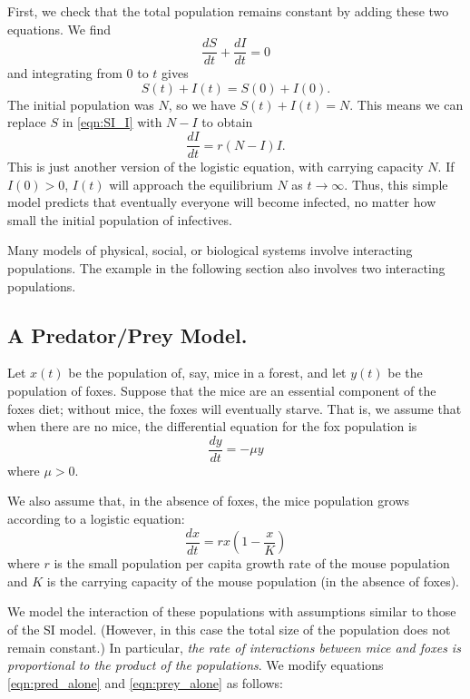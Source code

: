 First, we check that the total population remains constant by adding these
two equations.  We find
\begin{equation}
  \frac{dS}{dt} + \frac{dI}{dt} = 0
\end{equation}
and integrating from $0$ to $t$ gives
\begin{equation}
  S(t) + I(t) = S(0)+I(0).
\end{equation}
The initial population was $N$, so we have
$S(t)+I(t)=N$.
This means we can replace $S$ in \eqref{eqn:SI_I} with
$N-I$ to obtain
\begin{equation}
  \frac{dI}{dt} = r(N-I)I.
\label{eqn:SI_Ionly}
\end{equation}
This is just another version of the logistic equation,
with carrying capacity $N$.
If $I(0)>0$,  $I(t)$ will approach the
equilibrium $N$ as $t\rightarrow\infty$.
Thus, this simple model predicts that
eventually everyone will become infected, no matter how small
the initial population of infectives.


\medskip
Many models of physical, social, or biological systems
involve interacting populations.
The example in the following section also involves
two interacting populations.

\subsection{A Predator/Prey Model.}
Let $x(t)$ be the population of, say, mice in a forest,
and let $y(t)$ be the population of foxes.
Suppose that the mice
are an essential component of the foxes diet; without
mice, the foxes will eventually starve.
That is, we assume that when there are no mice, the
differential equation for the fox population is
\begin{equation}
   \frac{dy}{dt} = -\mu y
\label{eqn:pred_alone}
\end{equation}
where $\mu > 0$.

We also assume that, in the absence of foxes,
the mice population grows
according to a logistic equation:
\begin{equation}
   \frac{dx}{dt} = rx\left(1-\frac{x}{K}\right)
\label{eqn:prey_alone}
\end{equation}
where $r$ is the small population per capita growth rate
of the mouse population and $K$ is the carrying capacity
of the mouse population (in the absence of foxes).

We model the interaction of these populations
with assumptions similar to those of the SI model.
(However, in this case the total size of the population
does not remain constant.)
In particular,
\emph{the rate of interactions between
mice and foxes is proportional to the product
of the populations}.
We modify equations \eqref{eqn:pred_alone}
and \eqref{eqn:prey_alone} as follows:

